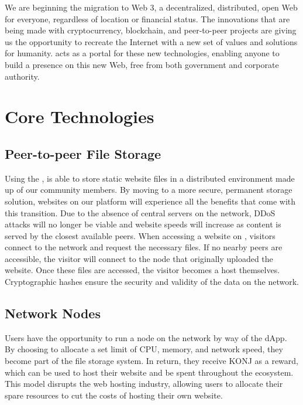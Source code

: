\documentclass{kwp-builder}
\begin{document}
We are beginning the migration to Web 3, a decentralized, distributed, open Web for everyone, regardless of location or financial status. The innovations that are being made with cryptocurrency, blockchain, and peer-to-peer projects are giving us the opportunity to recreate the Internet with a new set of values and solutions for humanity. \konjure acts as a portal for these new technologies, enabling anyone to build a presence on this new Web, free from both government and corporate authority.



\section{Core Technologies}
\subsection{Peer-to-peer File Storage}

\tab Using the , \konjure is able to store static website files in a distributed environment made up of our community members. By moving to a more secure, permanent storage solution, websites on our platform will experience all the benefits that come with this transition. Due to the absence of central servers on the network, DDoS attacks will no longer be viable and website speeds will increase as content is served by the closest available peers. When accessing a website on \konjure, visitors connect to the network and request the necessary files. If no nearby peers are accessible, the visitor will connect to the node that originally uploaded the website. Once these files are accessed, the visitor becomes a host themselves. Cryptographic hashes ensure the security and validity of the data on the network.

\subsection{Network Nodes}


\tab Users have the opportunity to run a node on the \konjure network by way of the \konjure dApp. By choosing to allocate a set limit of CPU, memory, and network speed, they become part of the file storage system. In return, they receive KONJ\kkonj{} as a reward, which can be used to host their website and be spent throughout the ecosystem. This model disrupts the web hosting industry, allowing users to allocate their spare resources to cut the costs of hosting their own website.
\end{document}
